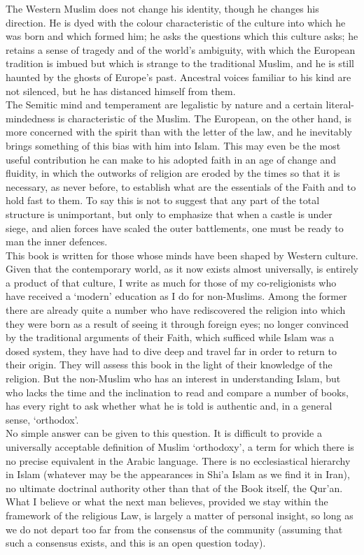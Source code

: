 \documentclass[10pt, twoside]{book}
\begin{document}
The Western Muslim does not change his identity, though he changes his direction. He is dyed with the colour characteristic of the culture into which he was born and which formed him; he asks the questions which this culture asks; he retains a sense of tragedy and of the world's ambiguity, with which the European tradition is imbued but which is strange to the traditional Muslim, and he is still haunted by the ghosts of Europe's past. Ancestral voices familiar to his kind are not silenced, but he has distanced himself from them. \\

The Semitic mind and temperament are legalistic by nature and a certain literal\hyp{}mindedness is characteristic of the Muslim. The European, on the other hand, is more concerned with the spirit than with the letter of the law, and he inevitably brings something of this bias with him into Islam. This may even be the most useful contribution he can make to his adopted faith in an age of change and fluidity, in which the outworks of religion are eroded by the times so that it is necessary, as never before, to establish what are the essentials of the Faith and to hold fast to them. To say this is not to suggest that any part of the total structure is unimportant, but only to emphasize that when a castle is under siege, and alien forces have scaled the outer battlements, one must be ready to man the inner defences. \\

This book is written for those whose minds have been shaped by Western culture. Given that the contemporary world, as it now exists almost universally, is entirely a product of that culture, I write as much for those of my co\hyp{}religionists who have received a `modern' education as I do for non\hyp{}Muslims. Among the former there are already quite a number who have rediscovered the religion into which they were born as a result of seeing it through foreign eyes; no longer convinced by the traditional arguments of their Faith, which sufficed while Islam was a dosed system, they have had to dive deep and travel far in order to return to their origin. They will assess this book in the light of their knowledge of the religion. But the non\hyp{}Muslim who has an interest in understanding Islam, but who lacks the time and the inclination to read and compare a number of books, has every right to ask whether what he is told is authentic and, in a general sense, `orthodox'. \\

No simple answer can be given to this question. It is difficult to provide a universally acceptable definition of Muslim `orthodoxy', a term for which there is no precise equivalent in the Arabic language. There is no ecclesiastical hierarchy in Islam (whatever may be the appearances in Shi'a Islam as we find it in Iran), no ultimate doctrinal authority other than that of the Book itself, the Qur'an. What I believe or what the next man believes, provided we stay within the framework of the religious Law, is largely a matter of personal insight, so long as we do not depart too far from the consensus of the community (assuming that such a consensus exists, and this is an open question today). \\
\end{document}
